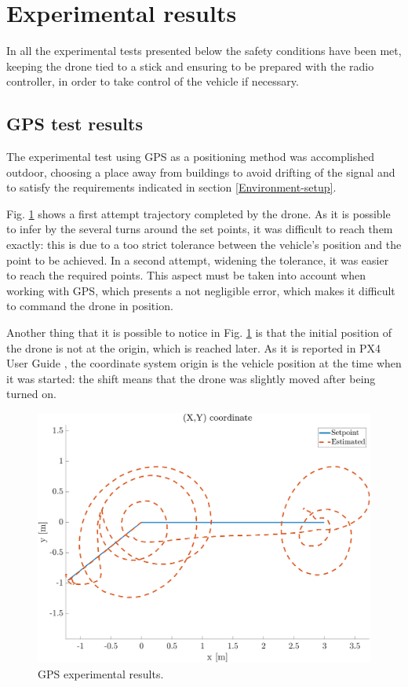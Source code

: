 \documentclass[journal]{IEEEtran}
\begin{document}
\section{Experimental results}
\label{experimental}

In all the experimental tests presented below the safety conditions have been met, keeping the drone tied to a stick and ensuring to be prepared with the radio controller, in order to take control of the vehicle if necessary. \\

\subsection{GPS test results}

The experimental test using GPS as a positioning method was accomplished outdoor, choosing a place away from buildings to avoid drifting of the signal and to satisfy the requirements indicated in section \ref{Environment-setup}. 

Fig. \ref{fig:gps_results} shows a first attempt trajectory completed by the drone. As it is possible to infer by the several turns around the set points, it was difficult to reach them exactly: this is due to a too strict tolerance between the vehicle's position and the point to be achieved. In a second attempt, widening the tolerance, it was easier to reach the required points. This aspect must be taken into account when working with GPS, which presents a not negligible error, which makes it difficult to command the drone in position.

Another thing that it is possible to notice in Fig. \ref{fig:gps_results} is that the initial position of the drone is not at the origin, which is reached later. As it is reported in PX4 User Guide \cite{VehicleLocalPos}, the coordinate system origin is the vehicle position at the time when it was started: the shift means that the drone was slightly moved after being turned on.

\begin{figure}
    \centering
    \includegraphics[scale=0.2]{Images/xy_gps.png}
    \caption{GPS experimental results.}
    \label{fig:gps_results}
\end{figure}
\end{document}

